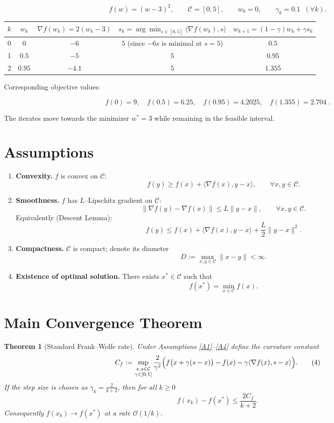 \documentclass[11pt]{article}
\newtheorem{theorem}{Theorem}
\newcommand{\Cset}{\mathcal{C}}
\begin{document}
\[
f(w)=(w-3)^{2},\qquad \Cset=[0,5],\qquad w_{0}=0,\qquad\gamma_{k}=0.1\;\;(\forall k).
\]

\begin{center}
\begin{tabular}{c|c|c|c|c}
$k$ & $w_{k}$ & $\nabla f(w_{k})=2(w_{k}-3)$ & $s_{k}=\arg\min_{s\in[0,5]}\langle\nabla f(w_{k}),s\rangle$ & $w_{k+1}=(1-\gamma)w_{k}+\gamma s_{k}$ \\ \hline
0 & $0$ & $-6$ & $5$ (since $-6s$ is minimal at $s=5$) & $0.5$ \\
1 & $0.5$ & $-5$ & $5$ & $0.95$ \\
2 & $0.95$ & $-4.1$ & $5$ & $1.355$ \\
\end{tabular}
\end{center}

Corresponding objective values:

\[
f(0)=9,\quad f(0.5)=6.25,\quad f(0.95)=4.2025,\quad f(1.355)=2.704\;.
\]

The iterates move towards the minimizer $w^{*}=3$ while remaining in the feasible interval.

\newpage
\section*{Assumptions}
\begin{enumerate}[label=\textbf{A\arabic*:}, leftmargin=*]
\item \label{A1} \textbf{Convexity.} $f$ is convex on $\Cset$:
\[
f(y)\ge f(x)+\langle\nabla f(x),y-x\rangle,\qquad\forall x,y\in\Cset.
\]
\item \label{A2} \textbf{Smoothness.} $f$ has $L$–Lipschitz gradient on $\Cset$:
\[
\|\nabla f(y)-\nabla f(x)\| \le L\|y-x\|,\qquad\forall x,y\in\Cset.
\]
Equivalently (Descent Lemma):
\[
f(y)\le f(x)+\langle\nabla f(x),y-x\rangle+\frac{L}{2}\|y-x\|^{2}.
\tag{3}
\]
\item \label{A3} \textbf{Compactness.} $\Cset$ is compact; denote its diameter
\[
D:=\max_{x,y\in\Cset}\|x-y\|<\infty .
\]
\item \label{A4} \textbf{Existence of optimal solution.} There exists $x^{*}\in\Cset$ such that
\[
f(x^{*})=\min_{x\in\Cset}f(x).
\]
\end{enumerate}

\section*{Main Convergence Theorem}
\begin{theorem}[Standard Frank–Wolfe rate]\label{thm:FW}
Under Assumptions \ref{A1}–\ref{A4} define the curvature constant
\[
C_{f}:=\sup_{\substack{x,s\in\Cset\\ \gamma\in[0,1]}}
\frac{2}{\gamma^{2}}\Bigl( f\bigl(x+\gamma(s-x)\bigr)-f(x)-\gamma\langle\nabla f(x),s-x\rangle\Bigr).
\tag{4}
\]
If the step size is chosen as $\displaystyle\gamma_{k}= \frac{2}{k+2}$, then for all $k\ge0$
\[
f(x_{k})-f(x^{*})\le \frac{2C_{f}}{k+2}.
\tag{5}
\]
Consequently $f(x_{k})\to f(x^{*})$ at a rate $\mathcal{O}(1/k)$.
\end{theorem}
\end{document}
